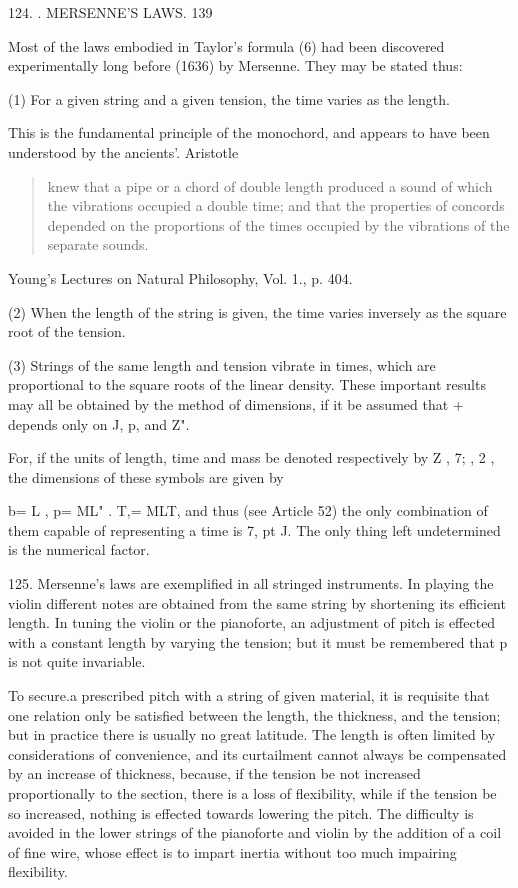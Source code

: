 124. . MERSENNE'S LAWS. 139

Most of the laws embodied in Taylor's formula (6) had been discovered
experimentally long before (1636) by Mersenne. They may be stated thus:

(1) For a given string and a given tension, the time varies as the length.

This is the fundamental principle of the monochord, and appears to have been
understood by the ancients'.  Aristotle
\begin{quote} knew that a pipe or a
chord of double length produced a sound of which the vibrations occupied a
double time; and that the properties of concords depended on the proportions of
the times occupied by the vibrations of the separate sounds.
\end{quote}
Young's Lectures on Natural Philosophy, Vol. 1., p. 404.

(2) When the length of the string is given, the time varies inversely as the
square root of the tension.

(3) Strings of the same length and tension vibrate in times, which are
proportional to the square roots of the linear density. These important results
may all be obtained by the method of dimensions, if it be assumed that +
depends only on J, p, and Z".

For, if the units of length, time and mass be denoted respectively by Z , 7; ,
2 , the dimensions of these symbols are given by

b= L , p= ML" . T,= MLT, and thus (see Article 52) the only combination of them
capable of representing a time is 7, pt J. The only thing left undetermined is
the numerical factor.

125. Mersenne's laws are exemplified in all stringed instruments. In playing
the violin different notes are obtained from the same string by shortening its
efficient length. In tuning the violin or the pianoforte, an adjustment of
pitch is effected with a constant length by varying the tension; but it must be
remembered that p is not quite invariable.

To secure.a prescribed pitch with a string of given material, it is requisite
that one relation only be satisfied between the length, the thickness, and the
tension; but in practice there is usually no great latitude. The length is
often limited by considerations of convenience, and its curtailment cannot
always be compensated by an increase of thickness, because, if the tension be
not increased proportionally to the section, there is a loss of flexibility,
while if the tension be so increased, nothing is effected towards lowering the
pitch. The difficulty is avoided in the lower strings of the pianoforte and
violin by the addition of a coil of fine wire, whose effect is to impart
inertia without too much impairing flexibility.

